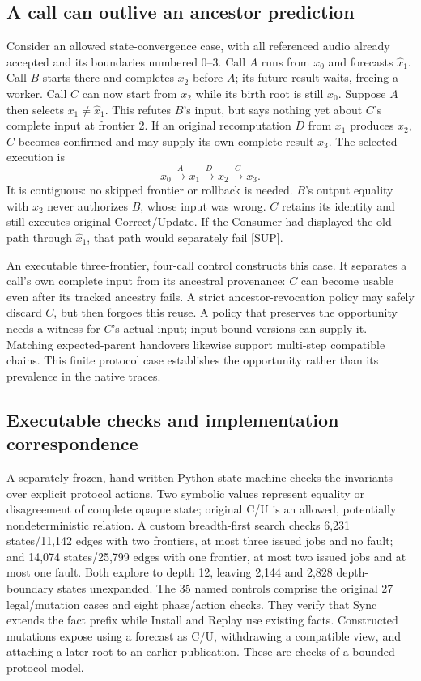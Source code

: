 \subsection{A call can outlive an ancestor prediction}\label{subsec:ancestor_outlives}
Consider an allowed state-convergence case, with all referenced audio
already accepted and its boundaries numbered 0--3. Call $A$ runs from $x_0$ and forecasts
$\widehat x_1$. Call $B$ starts there and completes $x_2$ before $A$;
its future result waits, freeing a worker. Call $C$ can now start from
$x_2$ while its birth root is still $x_0$. Suppose $A$ then selects
$x_1\ne\widehat x_1$. This refutes $B$'s input, but says nothing yet
about $C$'s complete input at frontier 2. If an original recomputation
$D$ from $x_1$ produces $x_2$, $C$ becomes confirmed and may supply its
own complete result $x_3$. The selected execution is
\begin{equation}
 x_0\xrightarrow{A}x_1\xrightarrow{D}x_2\xrightarrow{C}x_3.
\end{equation}
It is contiguous: no skipped frontier or rollback is needed. $B$'s
output equality with $x_2$ never authorizes $B$, whose input was wrong.
$C$ retains its identity and still executes original Correct/Update.
If the Consumer had displayed the old path through $\widehat x_1$,
that path would separately fail [SUP].

An executable three-frontier, four-call control constructs this case.
It separates a call's own complete input from its ancestral provenance:
$C$ can become usable even after its tracked ancestry fails. A strict
ancestor-revocation policy may safely discard $C$, but then forgoes this
reuse. A policy that preserves the opportunity needs a witness for $C$'s
actual input; input-bound versions can supply it. Matching expected-parent
handovers likewise support multi-step compatible chains. This finite
protocol case establishes the opportunity rather than its prevalence
in the native traces.

\subsection{Executable checks and implementation correspondence}
\label{subsec:native_refinement}
A separately frozen, hand-written Python state machine checks the
invariants over explicit protocol actions. Two symbolic values represent
equality or disagreement of complete opaque state; original C/U is an
allowed, potentially nondeterministic relation. A custom breadth-first
search checks 6,231 states/11,142 edges with two frontiers, at most three
issued jobs and no fault; and 14,074 states/25,799 edges with one frontier,
at most two issued jobs and at most one fault. Both explore to depth 12, leaving
2,144 and 2,828 depth-boundary states unexpanded. The 35 named controls
comprise the original 27 legal/mutation cases and eight phase/action
checks. They verify that Sync extends the fact prefix while Install and
Replay use existing facts. Constructed mutations expose using a forecast
as C/U, withdrawing a compatible view, and attaching a later root to an
earlier publication. These are checks of a bounded protocol model.

